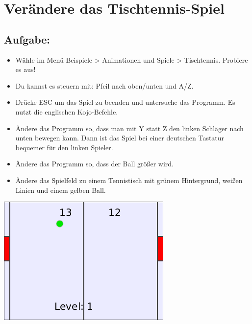 \chapter{Verändere das Tischtennis-Spiel}
\begin{multicols}{2}
\section*{\color{BrickRed}Aufgabe:}


\begin{itemize}

\item {Wähle im Menü Beispiele > Animationen und Spiele > Tischtennis. Probiere es aus!}
\item {Du kannst es steuern mit: Pfeil nach oben/unten und A/Z.}
\item {Drücke ESC um das Spiel zu beenden und untersuche das Programm. Es nutzt die englischen Kojo-Befehle.}
\item {Ändere das Programm so, dass man mit Y statt Z den linken Schläger nach unten bewegen kann. Dann ist das Spiel bei einer deutschen Tastatur bequemer für den linken Spieler.}
\item {Ändere das Programm so, dass der Ball größer wird.}
\item {Ändere das Spielfeld zu einem Tennistisch mit grünem Hintergrund, weißen Linien und einem gelben Ball.}

\end{itemize}



\columnbreak

\begin{center}
\includegraphics{../img/pong.png}
\end{center}

\end{multicols}

